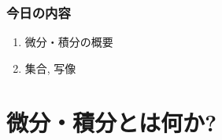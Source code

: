 \documentclass[dvipdfmx,cjk,10.2pt]{beamer}
\theoremstyle{definition}
\begin{document}

%
%
%
%
%
%
%






\begin{frame}
\frametitle{今日の内容}



\begin{enumerate}
\item 微分・積分の概要
\item 集合, 写像
\end{enumerate}


\end{frame}





\section{微分・積分とは何か?}
\end{document}
